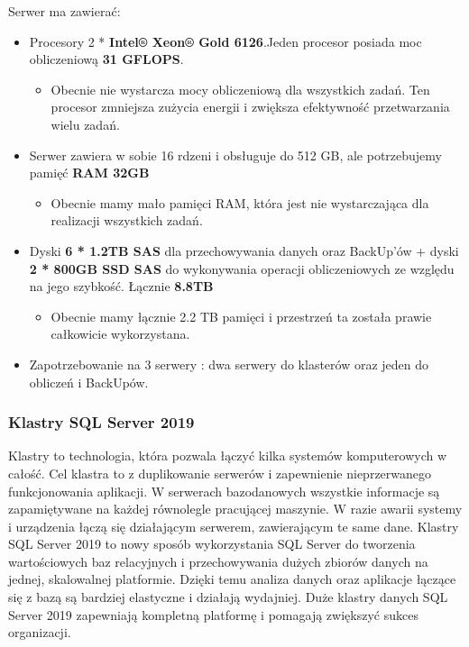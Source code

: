 \documentclass[a4paper, 12pt]{article}
\begin{document}
Serwer ma zawierać: 
				\begin{itemize}
\item Procesory 2 * \textbf{Intel® Xeon® Gold 6126}.Jeden procesor posiada moc obliczeniową \textbf{31 GFLOPS}. 
							\begin{itemize}
\item Obecnie nie wystarcza mocy obliczeniową dla wszystkich zadań. Ten procesor zmniejsza zużycia energii i zwiększa efektywność przetwarzania wielu zadań.
							\end{itemize}
\item  Serwer zawiera w sobie 16 rdzeni i obsługuje do 512 GB, ale potrzebujemy pamięć \textbf{RAM 32GB}
							\begin{itemize}
\item Obecnie mamy mało pamięci RAM, która jest nie wystarczająca dla realizacji wszystkich zadań.
							\end{itemize}
\item Dyski \textbf{ 6 * 1.2TB SAS} dla przechowywania danych  oraz BackUp'ów  + dyski \textbf{2 * 800GB SSD SAS} do wykonywania operacji obliczeniowych ze względu na jego szybkość. Łącznie \textbf{8.8TB} 
								\begin{itemize}
\item Obecnie mamy łącznie 2.2 TB pamięci i przestrzeń ta została prawie całkowicie wykorzystana.
								\end{itemize}
\item Zapotrzebowanie na 3 serwery : dwa serwery do klasterów oraz jeden do obliczeń i BackUpów.
				\end{itemize}			
				\subsubsection{Klastry SQL Server 2019} 	
	\hspace*{1cm} Klastry to technologia, która pozwala łączyć kilka systemów komputerowych w całość. 
Cel klastra to z duplikowanie  serwerów i zapewnienie nieprzerwanego funkcjonowania aplikacji. W serwerach bazodanowych wszystkie informacje są zapamiętywane na każdej równolegle pracującej maszynie. W razie awarii systemy i urządzenia łączą się działającym serwerem, zawierającym te same dane.
\newline
	\hspace*{1cm}Klastry SQL Server 2019 to nowy sposób wykorzystania SQL Server do tworzenia wartościowych baz relacyjnych i przechowywania dużych zbiorów danych na jednej, skalowalnej platformie. Dzięki temu analiza danych oraz aplikacje łączące się z bazą są bardziej elastyczne i działają wydajniej. Duże klastry danych SQL Server 2019 zapewniają kompletną platformę i pomagają zwiększyć sukces  organizacji.
\end{document}
